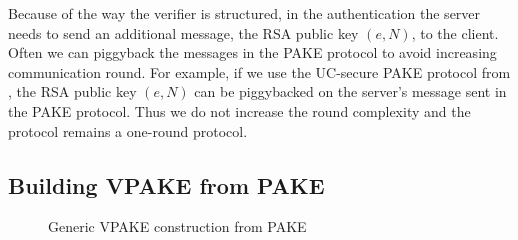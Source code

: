 Because of the way the verifier is structured, in the authentication the server needs to send an additional message, the RSA public key $(e,N)$, to the client. Often we can piggyback the messages in the PAKE protocol to avoid increasing communication round. 
For example, if we use the UC-secure PAKE protocol from \citet{Benhamouda2013}, the RSA public key $(e,N)$ can be piggybacked on the server's message sent in the PAKE protocol. Thus we do not increase the round complexity and the protocol remains a one-round protocol.


\subsection{Building VPAKE from PAKE}

\begin{figure}[htbp]
\centering
{}
\caption{Generic VPAKE construction from PAKE}
\label{fig:genericVPAKE}
\end{figure}

